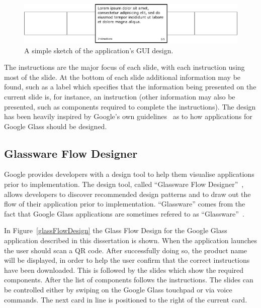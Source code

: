 	\begin{figure}[ht!]
		\centering
		\includegraphics[width=150mm]{images/cardDesign2}
		\caption{A simple sketch of the application's GUI design.}
		\label{cardDesign}
	\end{figure}

The instructions are the major focus of each slide, with each instruction using most of the slide. At the bottom of each slide additional information may be found, such as a label which specifies that the information being presented on the current slide is, for instance, an instruction (other information may also be presented, such as components required to complete the instructions). The design has been heavily inspired by Google's own guidelines~\cite{glassDesignPrinciples} as to how applications for Google Glass should be designed.

\subsection{Glassware Flow Designer}
Google provides developers with a design tool to help them visualise applications prior to implementation. The design tool, called ``Glassware Flow Designer''~\cite{glasswareFlowDesigner}, allows developers to discover recommended design patterns and to draw out the flow of their application prior to implementation. ``Glassware'' comes from the fact that Google Glass applications are sometimes refered to as ``Glassware''~\cite{glassware}.

In Figure~\ref{glassFlowDesign} the Glass Flow Design for the Google Glass application described in this dissertation is shown. When the application launches the user should scan a QR code. After successfully doing so, the product name will be displayed, in order to help the user confirm that the correct instructions have been downloaded. This is followed by the slides which show the required components. After the list of components follows the instructions. The slides can be controlled either by swiping on the Google Glass touchpad or via voice commands. The next card in line is positioned to the right of the current card.


